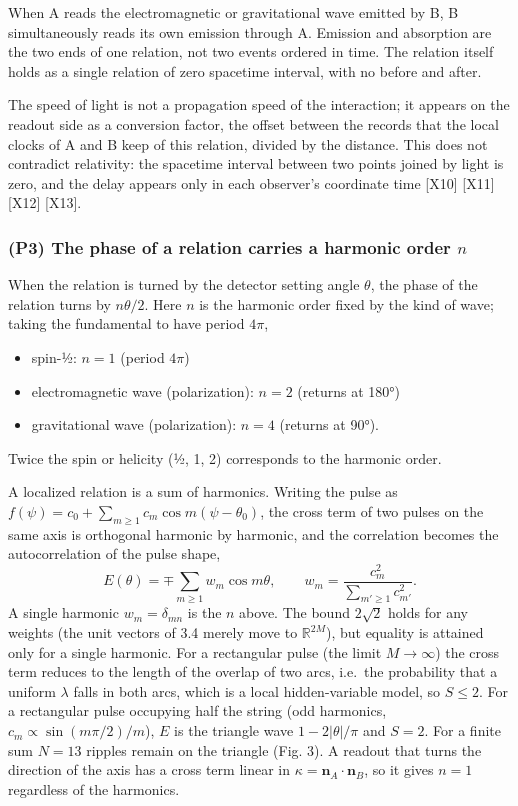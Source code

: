 \documentclass[
  a4paper,
]{article}
\providecommand{\tightlist}{%
  \setlength{\itemsep}{0pt}\setlength{\parskip}{0pt}}
\begin{document}
When A reads the electromagnetic or gravitational wave emitted by B, B
simultaneously reads its own emission through A. Emission and absorption
are the two ends of one relation, not two events ordered in time. The
relation itself holds as a single relation of zero spacetime interval,
with no before and after.

The speed of light is not a propagation speed of the interaction; it
appears on the readout side as a conversion factor, the offset between
the records that the local clocks of A and B keep of this relation,
divided by the distance. This does not contradict relativity: the
spacetime interval between two points joined by light is zero, and the
delay appears only in each observer's coordinate time {[}X10{]}
{[}X11{]} {[}X12{]} {[}X13{]}.

\subsubsection{\texorpdfstring{(P3) The phase of a relation carries a
harmonic order
\(n\)}{(P3) The phase of a relation carries a harmonic order n}}\label{p3-the-phase-of-a-relation-carries-a-harmonic-order-n}

When the relation is turned by the detector setting angle \(\theta\),
the phase of the relation turns by \(n\theta/2\). Here \(n\) is the
harmonic order fixed by the kind of wave; taking the fundamental to have
period \(4\pi\),

\begin{itemize}
\tightlist
\item
  spin-½: \(n=1\) (period \(4\pi\))
\item
  electromagnetic wave (polarization): \(n=2\) (returns at 180°)
\item
  gravitational wave (polarization): \(n=4\) (returns at 90°).
\end{itemize}

Twice the spin or helicity (½, 1, 2) corresponds to the harmonic order.

A localized relation is a sum of harmonics. Writing the pulse as
\(f(\psi)=c_0+\sum_{m\ge1}c_m\cos m(\psi-\theta_0)\), the cross term of
two pulses on the same axis is orthogonal harmonic by harmonic, and the
correlation becomes the autocorrelation of the pulse shape,
\[E(\theta)=\mp\sum_{m\ge1}w_m\cos m\theta,\qquad w_m=\frac{c_m^{2}}{\sum_{m'\ge1}c_{m'}^{2}}.\]
A single harmonic \(w_m=\delta_{mn}\) is the \(n\) above. The bound
\(2\sqrt{2}\) holds for any weights (the unit vectors of 3.4 merely move
to \(\mathbb{R}^{2M}\)), but equality is attained only for a single
harmonic. For a rectangular pulse (the limit \(M\to\infty\)) the cross
term reduces to the length of the overlap of two arcs, i.e.~the
probability that a uniform \(\lambda\) falls in both arcs, which is a
local hidden-variable model, so \(S\le2\). For a rectangular pulse
occupying half the string (odd harmonics, \(c_m\propto\sin(m\pi/2)/m\)),
\(E\) is the triangle wave \(1-2|\theta|/\pi\) and \(S=2\). For a finite
sum \(N=13\) ripples remain on the triangle (Fig. 3). A readout that
turns the direction of the axis has a cross term linear in
\(\kappa=\boldsymbol{n}_A\cdot\boldsymbol{n}_B\), so it gives \(n=1\)
regardless of the harmonics.
\end{document}

